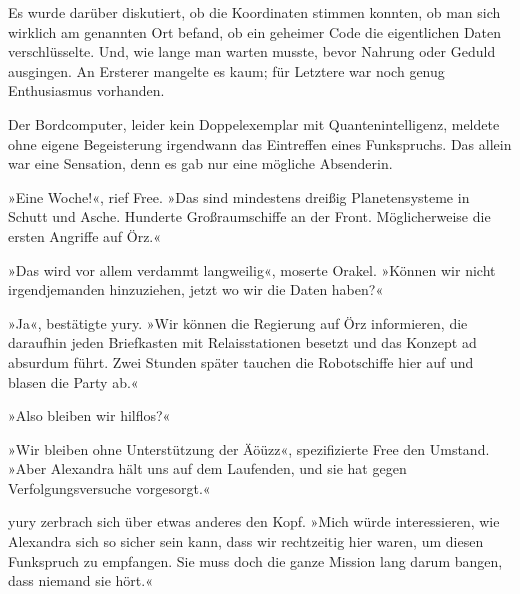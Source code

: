 Es wurde darüber diskutiert, ob die Koordinaten stimmen konnten, ob man sich wirklich am genannten Ort befand, ob ein geheimer Code die eigentlichen Daten verschlüsselte. Und, wie lange man warten musste, bevor Nahrung oder Geduld ausgingen. An Ersterer mangelte es kaum; für Letztere war noch genug Enthusiasmus vorhanden.

Der Bordcomputer, leider kein Doppelexemplar mit Quantenintelligenz, meldete ohne eigene Begeisterung irgendwann das Eintreffen eines Funkspruchs. Das allein war eine Sensation, denn es gab nur eine mögliche Absenderin.


»Eine Woche!«, rief Free. »Das sind mindestens dreißig Planetensysteme in Schutt und Asche. Hunderte Großraumschiffe an der Front. Möglicherweise die ersten Angriffe auf Örz.«

»Das wird vor allem verdammt langweilig«, moserte Orakel. »Können wir nicht irgendjemanden hinzuziehen, jetzt wo wir die Daten haben?«

»Ja«, bestätigte yury. »Wir können die Regierung auf Örz informieren, die daraufhin jeden Briefkasten mit Relaisstationen besetzt und das Konzept ad absurdum führt. Zwei Stunden später tauchen die Robotschiffe hier auf und blasen die Party ab.«

»Also bleiben wir hilflos?«

»Wir bleiben ohne Unterstützung der Äöüzz«, spezifizierte Free den Umstand. »Aber Alexandra hält uns auf dem Laufenden, und sie hat gegen Verfolgungsversuche vorgesorgt.«

yury zerbrach sich über etwas anderes den Kopf. »Mich würde interessieren, wie Alexandra sich so sicher sein kann, dass wir rechtzeitig hier waren, um diesen Funkspruch zu empfangen. Sie muss doch die ganze Mission lang darum bangen, dass niemand sie hört.«

